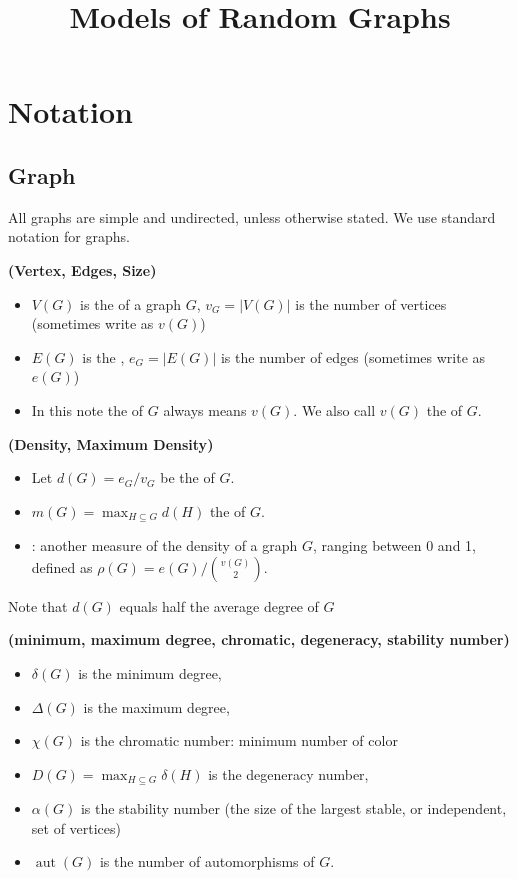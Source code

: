 \documentclass{article}
\title{Models of Random Graphs}
\newcommand{\bfs}[1]{\textbf{({#1}) }}
\begin{document}
\maketitle
\section{Notation}
\subsection{Graph}
All graphs are simple and undirected, unless otherwise stated. We use standard notation for graphs. 
\begin{defa}{\bfs{Vertex, Edges, Size}}
\begin{itemize}
    \item $V(G)$ is the  of a graph $G$, $v_{G}=|V(G)|$ is the number of vertices (sometimes write as $v(G)$)
    \item   $E(G)$ is the , $e_{G}=|E(G)|$ is the number of edges  (sometimes write as $e(G)$)
    \item In this note the  of $G$ always means $v(G)$. We also call $v(G)$ the  of $G$.
\end{itemize}
\end{defa}
\begin{defa}{\bfs{Density,  Maximum Density}}
\begin{itemize}
    \item Let $d(G)=e_{G} / v_{G}$ be the  of $G$.
    \item $m(G)=\max _{H \subseteq G} d(H)$ the  of $G$. 
    \item  {}: another measure of the density of a graph $G$, ranging between 0 and 1, defined as $\rho(G)=e(G) /\binom{v(G)}{2}.$
\end{itemize}
\begin{rema}
Note that $d(G)$ equals half the average degree of $G$
\end{rema}
\end{defa}
\begin{defa}{\bfs{minimum, maximum degree, chromatic, degeneracy, stability number}}
\begin{itemize}
    \item $\delta(G)$ is the minimum degree,
    \item  $\Delta(G)$ is the maximum degree, 
    \item $\chi(G)$ is the chromatic number: minimum number of color
    \item $D(G)=\max _{H \subseteq G} \delta(H)$ is the degeneracy number,
    \item  $\alpha(G)$ is the stability number (the size of the largest stable, or independent, set of vertices)
    \item   $\operatorname{aut}(G)$ is the number of automorphisms of $G$.
\end{itemize}
\end{defa}
\end{document}
